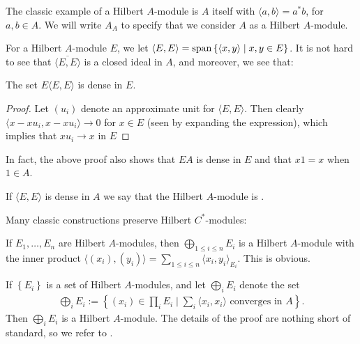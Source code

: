 \begin{example}
	The classic example of a Hilbert $A$-module is $A$ itself with $\langle a,b \rangle = a^*b$, for $a,b \in A$. We will write $A_A$ to specify that we consider $A$ as a Hilbert $A$-module.
\end{example}

For a Hilbert $A$-module $E$, we let $\langle E,E \rangle =  \mathrm{span} \left\{ \langle x,y \rangle \mid x,y \in E \right\}$. It is not hard to see that $\overline{\langle E,E \rangle}$ is a closed ideal in $A$, and moreover, we see that:
\begin{lemma}
	The set $E\langle E,E\rangle$ is dense in $E$.
	\label{EEEdense}
\end{lemma}
\begin{proof}
	Let $(u_i)$ denote an approximate unit for $\langle E,E \rangle$. Then clearly $\langle x-x u_i , x-x u_i\rangle \to 0$ for $x \in E$ (seen by expanding the expression), which implies that $x u_i \to x$ in $E$
\end{proof}
In fact, the above proof also shows that $EA$ is dense in $E$ and that $x1=x$ when $1 \in A$.

\begin{definition}
	If $\langle E,E \rangle$ is dense in $A$ we say that the Hilbert $A$-module is .
\end{definition}

Many classic constructions preserve Hilbert $C^*$-modules:
\begin{example}
	If $E_1,\dots,E_n$ are Hilbert $A$-modules, then $\bigoplus_{1 \leq i \leq n} E_i$ is a Hilbert $A$-module with the inner product $\langle (x_i),(y_i)\rangle = \sum_{1 \leq i \leq n} \langle x_i,y_i\rangle_{E_i}$. This is obvious.
\end{example}

\begin{example}
	If $\left\{ E_i \right\}$ is a set of Hilbert $A$-modules, and let $\bigoplus_i E_i$ denote the set
	\begin{align*}
		\bigoplus_i E_i := \left\{ (x_i) \in \prod_i E_i \mid \sum_{i} \langle x_i,x_i\rangle \text{ converges in } A \right\}.
	\end{align*}
	Then $\bigoplus_i E_i$ is a Hilbert $A$-module. The details of the proof are nothing short of standard, so we refer to \cite[5]{lance1995hilbert}.
\end{example}

